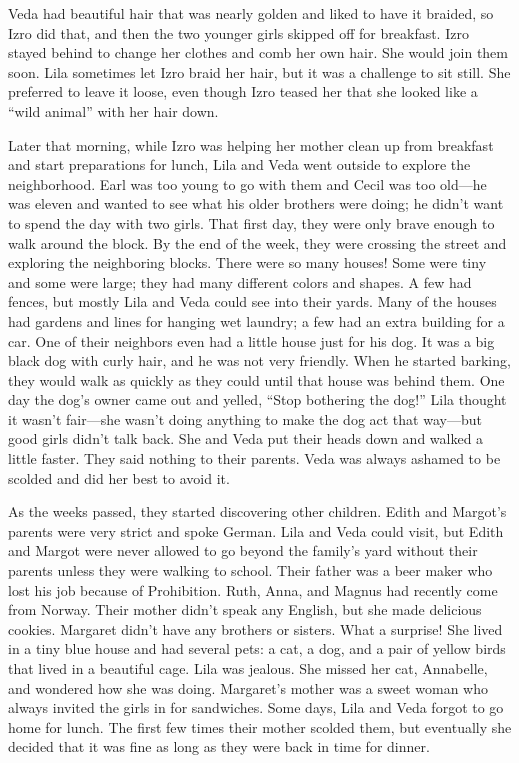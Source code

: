 \documentclass[
  letterpaper,
]{book}
\begin{document}
Veda had beautiful hair that was nearly golden and liked to have it
braided, so Izro did that, and then the two younger girls skipped off
for breakfast. Izro stayed behind to change her clothes and comb her own
hair. She would join them soon. Lila sometimes let Izro braid her hair,
but it was a challenge to sit still. She preferred to leave it loose,
even though Izro teased her that she looked like a ``wild animal'' with
her hair down.

Later that morning, while Izro was helping her mother clean up from
breakfast and start preparations for lunch, Lila and Veda went outside
to explore the neighborhood. Earl was too young to go with them and
Cecil was too old---he was eleven and wanted to see what his older
brothers were doing; he didn't want to spend the day with two girls.
That first day, they were only brave enough to walk around the block. By
the end of the week, they were crossing the street and exploring the
neighboring blocks. There were so many houses! Some were tiny and some
were large; they had many different colors and shapes. A few had fences,
but mostly Lila and Veda could see into their yards. Many of the houses
had gardens and lines for hanging wet laundry; a few had an extra
building for a car. One of their neighbors even had a little house just
for his dog. It was a big black dog with curly hair, and he was not very
friendly. When he started barking, they would walk as quickly as they
could until that house was behind them. One day the dog's owner came out
and yelled, ``Stop bothering the dog!'' Lila thought it wasn't
fair---she wasn't doing anything to make the dog act that way---but good
girls didn't talk back. She and Veda put their heads down and walked a
little faster. They said nothing to their parents. Veda was always
ashamed to be scolded and did her best to avoid it.

As the weeks passed, they started discovering other children. Edith and
Margot's parents were very strict and spoke German. Lila and Veda could
visit, but Edith and Margot were never allowed to go beyond the family's
yard without their parents unless they were walking to school. Their
father was a beer maker who lost his job because of Prohibition. Ruth,
Anna, and Magnus had recently come from Norway. Their mother didn't
speak any English, but she made delicious cookies. Margaret didn't have
any brothers or sisters. What a surprise! She lived in a tiny blue house
and had several pets: a cat, a dog, and a pair of yellow birds that
lived in a beautiful cage. Lila was jealous. She missed her cat,
Annabelle, and wondered how she was doing. Margaret's mother was a sweet
woman who always invited the girls in for sandwiches. Some days, Lila
and Veda forgot to go home for lunch. The first few times their mother
scolded them, but eventually she decided that it was fine as long as
they were back in time for dinner.
\end{document}
